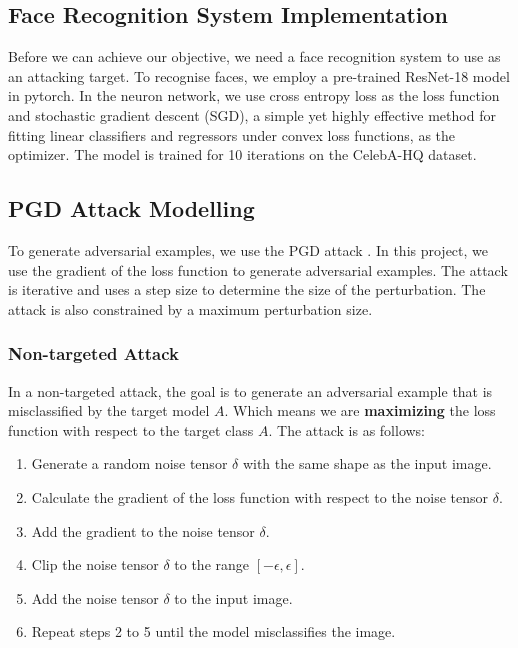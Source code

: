\subsection{Face Recognition System Implementation}

Before we can achieve our objective, we need a face recognition system to use as an attacking target. To recognise faces, we employ a pre-trained ResNet-18 model in pytorch.
In the neuron network, we use cross entropy loss as the loss function and stochastic gradient descent (SGD), a simple yet highly effective method for fitting linear classifiers and regressors under convex loss functions, as the optimizer. The model is trained for 10 iterations on the CelebA-HQ dataset.

\subsection{PGD Attack Modelling}

To generate adversarial examples, we use the PGD attack \cite{madry2017towards}. In this project, we use the gradient of the loss function to generate adversarial examples. The attack is iterative and uses a step size to determine the size of the perturbation. The attack is also constrained by a maximum perturbation size.

\subsubsection{Non-targeted Attack}

In a non-targeted attack, the goal is to generate an adversarial example that is misclassified by the target model $A$. Which means we are \textbf{maximizing} the loss function with respect to the target class $A$. The attack is as follows:

\begin{enumerate}
    \item Generate a random noise tensor $\delta$ with the same shape as the input image.
    \item Calculate the gradient of the loss function with respect to the noise tensor $\delta$.
    \item Add the gradient to the noise tensor $\delta$.
    \item Clip the noise tensor $\delta$ to the range $[-\epsilon, \epsilon]$.
    \item Add the noise tensor $\delta$ to the input image.
    \item Repeat steps 2 to 5 until the model misclassifies the image.
\end{enumerate}

